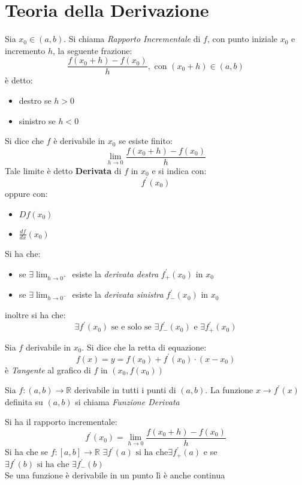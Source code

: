 \documentclass[a4paper,12pt, oneside]{book}
\begin{document}
\section{Teoria della Derivazione}
\begin{shaded} Sia $x_0\in(a,b)$. Si chiama \textit{Rapporto Incrementale} di
  $f$, con punto iniziale $x_0$ e incremento $h$, la seguente frazione:
  $$\frac{f(x_0+h)-f(x_0)}{h}, \mbox{ con } (x_0+h)\in (a,b)$$
  è detto:
  \begin{itemize}
    \item destro se $h>0$
    \item sinistro se $h<0$
  \end{itemize}
\end{shaded}
\begin{definizione} Si dice che $f$ è derivabile in $x_0$ se esiste finito:
  $$\lim_{h\rightarrow 0} \frac{f(x_0+h)-f(x_0)}{h}$$
  Tale limite è detto \textbf{Derivata} di $f$ in $x_0$ e si indica con:
  $$f^{'}(x_0)$$
  oppure con:
  \begin{itemize}
    \item $Df(x_0)$
    \item $\frac{df}{dx}(x_0)$
  \end{itemize}
  \newpage Si ha che:
  \begin{itemize}
    \item se $\exists \lim_{h\rightarrow 0^{+}}$ esiste la \textit{derivata
      destra} $f_{+}^{'}(x_0)$ in $x_0$
    \item se $\exists \lim_{h\rightarrow 0^{-}}$ esiste la \textit{derivata
      sinistra} $f_{-}^{'}(x_0)$ in $x_0$
  \end{itemize} inoltre si ha che:
  $$\exists f^{'}(x_0) \mbox{ se e solo se } \exists f_{-}^{'}(x_0) \mbox{ e } \exists f_{+}^{'}(x_0)$$
\end{definizione}
\begin{definizione} Sia $f$ derivabile in $x_0$. Si dice che la retta di
  equazione:
  $$f(x)=y=f(x_0)+f^{'}(x_0)\cdot (x-x_0)$$
  è \textit{Tangente} al grafico di $f$ in $(x_0,f(x_0))$
\end{definizione}
\begin{definizione} Sia $f:(a,b)\rightarrow \mathbb{R}$ derivabile in tutti i
  punti di $(a,b)$. La funzione $x\rightarrow f^{'}(x)$ definita su $(a,b)$ si
  chiama \textit{Funzione Derivata}
\end{definizione} Si ha il rapporto
incrementale: $$f^{'}(x_0)=\lim_{h\rightarrow 0}\frac{f(x_0+h)-f(x_0)}{h}$$ Si
ha che se $f:[a,b]\rightarrow \mathbb{R}$ $\exists f^{'} (a) \mbox{ si ha che
}\exists f^{'}_{+} (a)$ e se $\exists f^{'} (b) \mbox{ si ha che }\exists
f^{'}_{-} (b)$\\ Se una funzione è derivabile in un punto lì è anche continua
\end{document}
